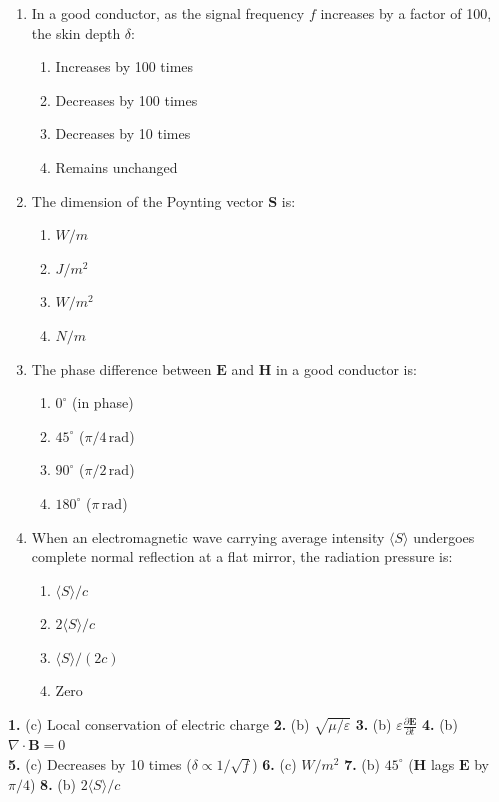 \begin{enumerate}
    \item In a good conductor, as the signal frequency $f$ increases by a factor of 100, the skin depth $\delta$:
    \begin{enumerate}
        \item Increases by 100 times
        \item Decreases by 100 times
        \item Decreases by 10 times
        \item Remains unchanged
    \end{enumerate}
    
    \item The dimension of the Poynting vector $\mathbf{S}$ is:
    \begin{enumerate}
        \item $\si{W/m}$
        \item $\si{J/m^2}$
        \item $\si{W/m^2}$
        \item $\si{N/m}$
    \end{enumerate}
    
    \item The phase difference between $\mathbf{E}$ and $\mathbf{H}$ in a good conductor is:
    \begin{enumerate}
        \item $0^\circ$ (in phase)
        \item $45^\circ$ ($\pi/4\,\text{rad}$)
        \item $90^\circ$ ($\pi/2\,\text{rad}$)
        \item $180^\circ$ ($\pi\,\text{rad}$)
    \end{enumerate}
    
    \item When an electromagnetic wave carrying average intensity $\langle S \rangle$ undergoes complete normal reflection at a flat mirror, the radiation pressure is:
    \begin{enumerate}
        \item $\langle S \rangle / c$
        \item $2\langle S \rangle / c$
        \item $\langle S \rangle / (2c)$
        \item Zero
    \end{enumerate}
\end{enumerate}

\begin{solutionbox}
\textbf{1.} (c) Local conservation of electric charge \quad \textbar\quad
\textbf{2.} (b) $\sqrt{\mu/\varepsilon}$ \quad \textbar\quad
\textbf{3.} (b) $\varepsilon \frac{\partial \mathbf{E}}{\partial t}$ \quad \textbar\quad
\textbf{4.} (b) $\nabla \cdot \mathbf{B} = 0$ \\
\textbf{5.} (c) Decreases by 10 times ($\delta \propto 1/\sqrt{f}$) \quad \textbar\quad
\textbf{6.} (c) $\si{W/m^2}$ \quad \textbar\quad
\textbf{7.} (b) $45^\circ$ ($\mathbf{H}$ lags $\mathbf{E}$ by $\pi/4$) \quad \textbar\quad
\textbf{8.} (b) $2\langle S \rangle / c$
\end{solutionbox}

